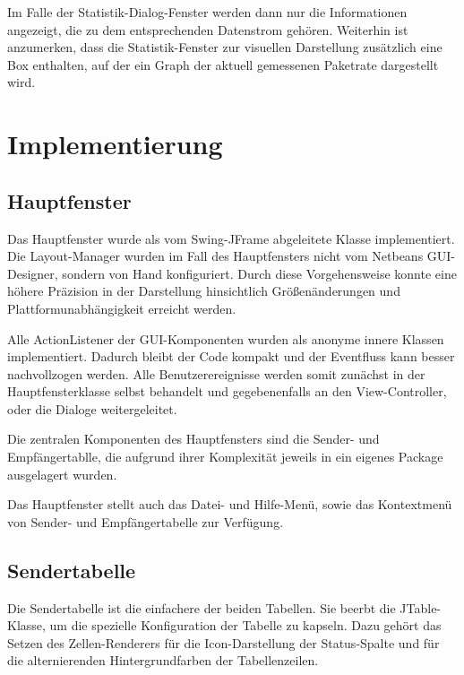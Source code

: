         	Im Falle der Statistik-Dialog-Fenster werden dann nur die Informationen
        	angezeigt, die zu dem entsprechenden Datenstrom gehören.
        	Weiterhin ist anzumerken, dass die Statistik-Fenster zur visuellen
        	Darstellung zusätzlich eine Box enthalten, auf der ein Graph der
        	aktuell gemessenen Paketrate dargestellt wird.

\chapter{Implementierung}

    \section{Hauptfenster}
    
        Das Hauptfenster wurde als vom Swing-JFrame abgeleitete Klasse
        implementiert. Die Layout-Manager wurden im Fall des Hauptfensters nicht
        vom Netbeans GUI-Designer, sondern von Hand konfiguriert. Durch diese
        Vorgehensweise konnte eine höhere Präzision in der Darstellung
        hinsichtlich Größenänderungen und Plattformunabhängigkeit erreicht
        werden.
        
        Alle ActionListener der GUI-Komponenten wurden als anonyme innere
        Klassen implementiert. Dadurch bleibt der Code kompakt und der
        Eventfluss kann besser nachvollzogen werden. Alle Benutzerereignisse
        werden somit zunächst in der Hauptfensterklasse selbst behandelt und
        gegebenenfalls an den View-Controller, oder die Dialoge weitergeleitet.
        
        Die zentralen Komponenten des Hauptfensters sind die Sender- und
        Empfängertablle, die aufgrund ihrer Komplexität jeweils in ein eigenes
        Package ausgelagert wurden.
        
        Das Hauptfenster stellt auch das Datei- und Hilfe-Menü, sowie das
        Kontextmenü von Sender- und Empfängertabelle zur Verfügung.
    
    \section{Sendertabelle}
    
        Die Sendertabelle ist die einfachere der beiden Tabellen. Sie beerbt die
        JTable-Klasse, um die spezielle Konfiguration der Tabelle zu kapseln.
        Dazu gehört das Setzen des Zellen-Renderers für die Icon-Darstellung der
        Status-Spalte und für die alternierenden Hintergrundfarben der
        Tabellenzeilen.
        
